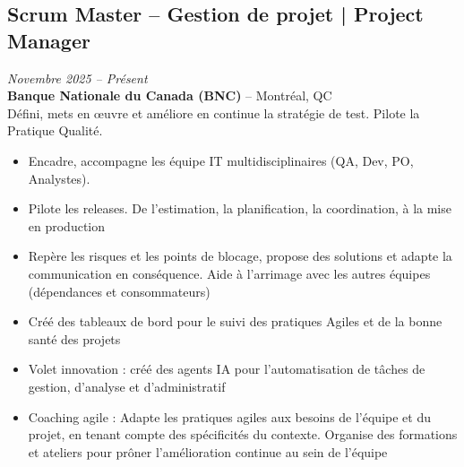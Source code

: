 \documentclass[11pt,a4paper]{article}
\begin{document}
\subsection*{Scrum Master -- Gestion de projet | Project Manager} \hfill \textit{Novembre 2025 -- Présent}\\
\textbf{Banque Nationale du Canada (BNC)} -- Montréal, QC\\
Défini, mets en œuvre et améliore en continue la stratégie de test. Pilote la Pratique Qualité.
\begin{itemize}
    \item Encadre, accompagne les équipe IT multidisciplinaires (QA, Dev, PO, Analystes).
    \item Pilote les releases. De l'estimation, la planification, la coordination, à la mise en production
    \item Repère les risques et les points de blocage, propose des solutions et adapte la communication en conséquence.  Aide à l'arrimage avec les autres équipes (dépendances et consommateurs)
    \item Créé des tableaux de bord pour le suivi des pratiques Agiles et de la bonne santé des projets
    \item Volet innovation : créé des agents IA pour l'automatisation de tâches de gestion, d'analyse et d'administratif
    \item Coaching agile : Adapte les pratiques agiles aux besoins de l'équipe et du projet, en tenant compte des spécificités du contexte. Organise des formations et ateliers pour prôner l'amélioration continue au sein de l'équipe
\end{itemize}
\end{document}
